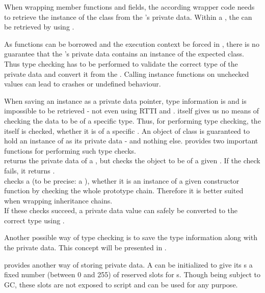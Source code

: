 When wrapping member functions and fields, the according wrapper code needs to retrieve the instance of the  class from the  's private data. Within a , the   can be retrieved by using .

As functions can be borrowed and the execution context be forced in , there is no guarantee that the 's private data contains an instance of the expected class. Thus type checking has to be performed to validate the correct type of the private data and convert it from the . Calling instance functions on unchecked values can lead to crashes or undefined behaviour.

When saving an instance as a private data  pointer, type information is  and is impossible to be retrieved - not even using RTTI and .  itself gives us no means of checking the data to be of a specific type. Thus, for performing type checking, the  itself is checked, whether it is of a specific . An object of class  is guaranteed to hold an instance of  as its private data - and nothing else.  provides two important functions for performing such type checks.\\
 returns the private data of a , but checks the object to be of a given . If the check fails, it returns .\\
 checks a  (to be precise: a ), whether it is an instance of a given constructor function by checking the whole prototype chain. Therefore it is better suited when wrapping inheritance chains.\\
If these checks succeed, a private data value can safely be converted to the correct  type using .

Another possible way of type checking is to save the type information along with the private data. This concept will be presented in .

 provides another way of storing private data. A  can be initialized to give its s a fixed number (between 0 and 255) of reserved slots for s. Though being subject to GC, these slots are not exposed to script and can be used for any purpose.

